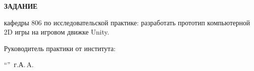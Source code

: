 \begin{center}
\bfseries{\large ЗАДАНИЕ}
\end{center}

кафедры 806 по исследовательской практике: разработать прототип компьютерной 2D игры на игровом движке Unity.

\vspace*{\fill}
Руководитель практики от института:

\vspace{5pt}
\enquote{\hspace{0.5cm}}  \the\year\,г. А.\,A. 
\pagebreak